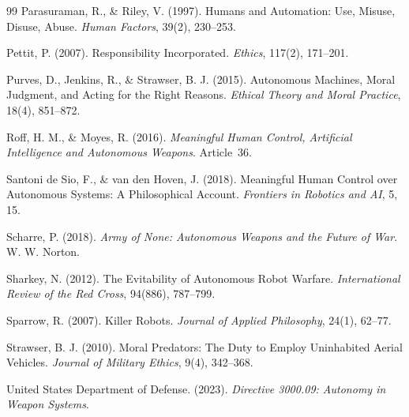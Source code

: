 \documentclass[11pt]{article}
\begin{document}
\begin{thebibliography}{99}
Parasuraman, R., \& Riley, V. (1997). Humans and Automation: Use, Misuse, Disuse, Abuse. \textit{Human Factors}, 39(2), 230--253.

Pettit, P. (2007). Responsibility Incorporated. \textit{Ethics}, 117(2), 171--201.

Purves, D., Jenkins, R., \& Strawser, B. J. (2015). Autonomous Machines, Moral Judgment, and Acting for the Right Reasons. \textit{Ethical Theory and Moral Practice}, 18(4), 851--872.

Roff, H. M., \& Moyes, R. (2016). \textit{Meaningful Human Control, Artificial Intelligence and Autonomous Weapons}. Article~36.

Santoni de Sio, F., \& van den Hoven, J. (2018). Meaningful Human Control over Autonomous Systems: A Philosophical Account. \textit{Frontiers in Robotics and AI}, 5, 15.

Scharre, P. (2018). \textit{Army of None: Autonomous Weapons and the Future of War}. W. W. Norton.

Sharkey, N. (2012). The Evitability of Autonomous Robot Warfare. \textit{International Review of the Red Cross}, 94(886), 787--799.

Sparrow, R. (2007). Killer Robots. \textit{Journal of Applied Philosophy}, 24(1), 62--77.

Strawser, B. J. (2010). Moral Predators: The Duty to Employ Uninhabited Aerial Vehicles. \textit{Journal of Military Ethics}, 9(4), 342--368.

United States Department of Defense. (2023). \textit{Directive 3000.09: Autonomy in Weapon Systems}.

\end{thebibliography}
\end{document}
